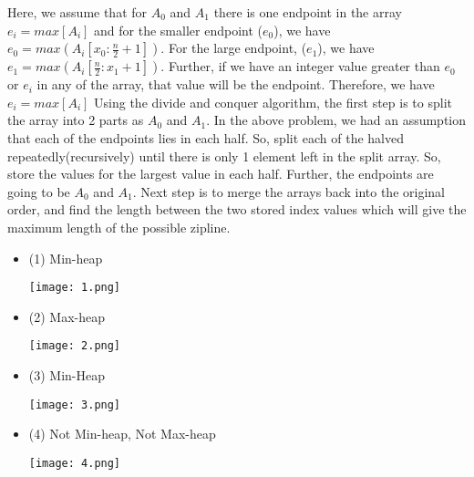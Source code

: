 \documentclass[12pt,twoside]{article}
\begin{document}


\begin{problems}

\problem  %

\begin{problemparts}
\problempart %
 Here, we assume that for $A_{0}$ and $A_{1}$ there is one endpoint in the array $e_{i} = max[A_{i}]$ and for the smaller endpoint ($e_{0}$), we have $e_{0} = max(A_{i}[x_{0}:\frac{n}{2} + 1])$. For the large endpoint, ($e_{1}$), we have $e_{1} = max(A_{i}[\frac{n}{2} : x_{1} + 1])$. Further, if we have an integer value greater than $e_{0}$ or $e_{i}$ in any of the array, that value will be the endpoint. Therefore, we have $e_{i} = max[A_{i}]$
\problempart %
Using the divide and conquer algorithm, the first step is to split the array into 2 parts as $A_{0}$ and $A_{1}$. In the above problem, we had an assumption that each of the endpoints lies in each half. So, split each of the halved repeatedly(recursively) until there is only 1 element left in the split array. So, store the values for the largest value in each half. Further, the endpoints are going to be $A_{0}$ and $A_{1}$. Next step is to merge the arrays back into the original order, and find the length between the two stored index values which will give the maximum length of the possible zipline.
\end{problemparts}

\newpage
\problem  %

\begin{problemparts}
\problempart %
\begin{itemize}
    \item (1) Min-heap
\begin{center}
  \texttt{[image: 1.png]}
\end{center}
    \item (2) Max-heap
\begin{center}
  \texttt{[image: 2.png]}
\end{center}
    \item  (3) Min-Heap
\begin{center}
  \texttt{[image: 3.png]}
\end{center}
    \item (4) Not Min-heap, Not Max-heap
\begin{center}
  \texttt{[image: 4.png]}
\end{center}


\end{itemize}
\end{problemparts}
\end{problems}
\end{document}

